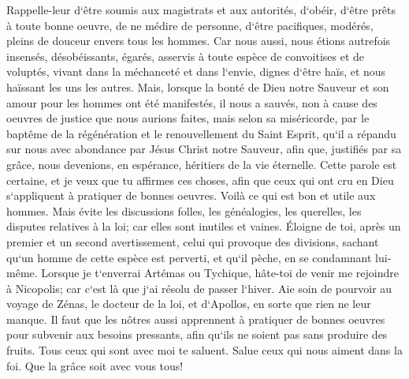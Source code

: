 \verse Rappelle-leur d`être soumis aux magistrats et aux autorités, d`obéir, d`être prêts à toute bonne oeuvre, 
\verse de ne médire de personne, d`être pacifiques, modérés, pleins de douceur envers tous les hommes. 
\verse Car nous aussi, nous étions autrefois insensés, désobéissants, égarés, asservis à toute espèce de convoitises et de voluptés, vivant dans la méchanceté et dans l`envie, dignes d`être haïs, et nous haïssant les uns les autres. 
\verse Mais, lorsque la bonté de Dieu notre Sauveur et son amour pour les hommes ont été manifestés, 
\verse il nous a sauvés, non à cause des oeuvres de justice que nous aurions faites, mais selon sa miséricorde, par le baptême de la régénération et le renouvellement du Saint Esprit, 
\verse qu`il a répandu sur nous avec abondance par Jésus Christ notre Sauveur, 
\verse afin que, justifiés par sa grâce, nous devenions, en espérance, héritiers de la vie éternelle. 
\verse Cette parole est certaine, et je veux que tu affirmes ces choses, afin que ceux qui ont cru en Dieu s`appliquent à pratiquer de bonnes oeuvres. 
\verse Voilà ce qui est bon et utile aux hommes. Mais évite les discussions folles, les généalogies, les querelles, les disputes relatives à la loi; car elles sont inutiles et vaines. 
\verse Éloigne de toi, après un premier et un second avertissement, celui qui provoque des divisions, 
\verse sachant qu`un homme de cette espèce est perverti, et qu`il pèche, en se condamnant lui-même. 
\verse Lorsque je t`enverrai Artémas ou Tychique, hâte-toi de venir me rejoindre à Nicopolis; car c`est là que j`ai résolu de passer l`hiver. 
\verse Aie soin de pourvoir au voyage de Zénas, le docteur de la loi, et d`Apollos, en sorte que rien ne leur manque. 
\verse Il faut que les nôtres aussi apprennent à pratiquer de bonnes oeuvres pour subvenir aux besoins pressants, afin qu`ils ne soient pas sans produire des fruits. 
\verse Tous ceux qui sont avec moi te saluent. Salue ceux qui nous aiment dans la foi. Que la grâce soit avec vous tous! 

